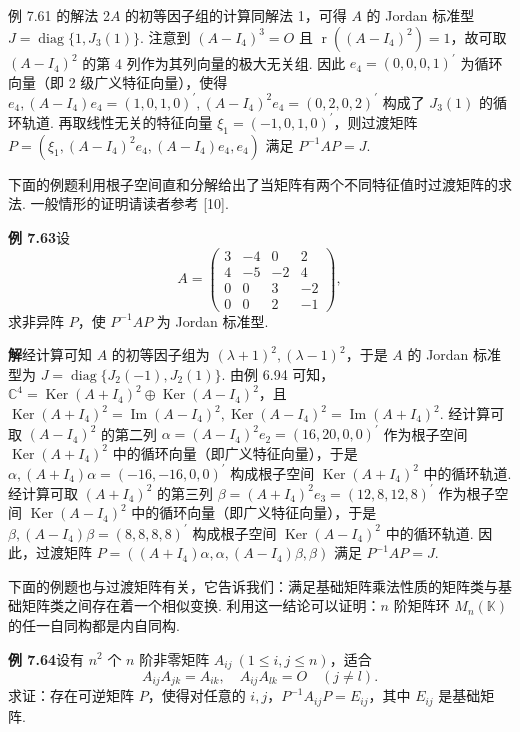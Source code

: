 \documentclass[UTF8,12pt,a4paper,fontset=fandol]{ctexart}
\begin{document}
例 7.61 的解法 2\quad $A$ 的初等因子组的计算同解法 1，可得 $A$ 的 Jordan 标准型 $J=\operatorname{diag}\{1,J_3(1)\}$. 注意到 $(A-I_4)^3=O$ 且 $\operatorname{r}((A-I_4)^2)=1$，故可取 $(A-I_4)^2$ 的第 4 列作为其列向量的极大无关组. 因此 $e_4=(0,0,0,1)^{\prime}$ 为循环向量（即 2 级广义特征向量），使得 $e_4,(A-I_4)e_4=(1,0,1,0)^{\prime},(A-I_4)^2e_4=(0,2,0,2)^{\prime}$ 构成了 $J_3(1)$ 的循环轨道. 再取线性无关的特征向量 $\xi_1=(-1,0,1,0)^{\prime}$，则过渡矩阵 $P=(\xi_1,(A-I_4)^2e_4,(A-I_4)e_4,e_4)$ 满足 $P^{-1}AP=J$.

下面的例题利用根子空间直和分解给出了当矩阵有两个不同特征值时过渡矩阵的求法. 一般情形的证明请读者参考 [10].

\noindent\textbf{例 7.63}\quad 设
\[
A=\left(\begin{array}{rrrr}
3&-4&0&2\\
4&-5&-2&4\\
0&0&3&-2\\
0&0&2&-1
\end{array}\right),
\]
求非异阵 $P$，使 $P^{-1}AP$ 为 Jordan 标准型.

\noindent\textbf{解}\quad 经计算可知 $A$ 的初等因子组为 $(\lambda+1)^2,(\lambda-1)^2$，于是 $A$ 的 Jordan 标准型为 $J=\operatorname{diag}\{J_2(-1),J_2(1)\}$. 由例 6.94 可知，$\mathbb{C}^4=\operatorname{Ker}(A+I_4)^2\oplus\operatorname{Ker}(A-I_4)^2$，且 $\operatorname{Ker}(A+I_4)^2=\operatorname{Im}(A-I_4)^2,\operatorname{Ker}(A-I_4)^2=\operatorname{Im}(A+I_4)^2$. 经计算可取 $(A-I_4)^2$ 的第二列 $\alpha=(A-I_4)^2e_2=(16,20,0,0)^{\prime}$ 作为根子空间 $\operatorname{Ker}(A+I_4)^2$ 中的循环向量（即广义特征向量），于是 $\alpha,(A+I_4)\alpha=(-16,-16,0,0)^{\prime}$ 构成根子空间 $\operatorname{Ker}(A+I_4)^2$ 中的循环轨道. 经计算可取 $(A+I_4)^2$ 的第三列 $\beta=(A+I_4)^2e_3=(12,8,12,8)^{\prime}$ 作为根子空间 $\operatorname{Ker}(A-I_4)^2$ 中的循环向量（即广义特征向量），于是 $\beta,(A-I_4)\beta=(8,8,8,8)^{\prime}$ 构成根子空间 $\operatorname{Ker}(A-I_4)^2$ 中的循环轨道. 因此，过渡矩阵 $P=((A+I_4)\alpha,\alpha,(A-I_4)\beta,\beta)$ 满足 $P^{-1}AP=J$.

下面的例题也与过渡矩阵有关，它告诉我们：满足基础矩阵乘法性质的矩阵类与基础矩阵类之间存在着一个相似变换. 利用这一结论可以证明：$n$ 阶矩阵环 $M_n(\mathbb{K})$ 的任一自同构都是内自同构.

\noindent\textbf{例 7.64}\quad 设有 $n^2$ 个 $n$ 阶非零矩阵 $A_{ij}\ (1\le i,j\le n)$，适合
\[
A_{ij}A_{jk}=A_{ik},\quad A_{ij}A_{lk}=O\quad (j\ne l).
\]
求证：存在可逆矩阵 $P$，使得对任意的 $i,j$，$P^{-1}A_{ij}P=E_{ij}$，其中 $E_{ij}$ 是基础矩阵.
\end{document}

